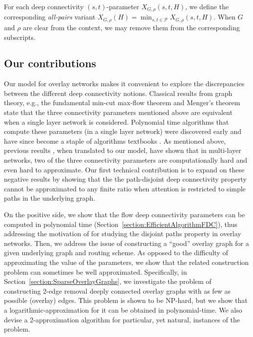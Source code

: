 \LongVersion \documentclass[11pt]{article}
\theoremstyle{definition}
\theoremstyle{plain}
\newcommand{\Peers}[0]{\mathcal{P}}
\begin{document}
For each deep connectivity $(s, t)$-parameter $X_{G,
\rho}(s,t,H)$, we define the corresponding
\emph{all-pairs} variant $X_{G, \rho}(H) = \min_{s, t \in \Peers} X_{G,
\rho}(s, t, H)$.
When $G$ and $\rho$ are clear from the context, we may remove them from the
corresponding subscripts.

\subsection{Our contributions}


Our model for overlay networks makes it convenient to explore the
discrepancies between the different deep connectivity notions.
Classical results from graph theory, e.g., the fundamental min-cut max-flow
theorem \cite{FF56,EFS56} and Menger's theorem \cite{Meng27} state that the
three connectivity parameters mentioned above are equivalent when a single
layer network is considered.
Polynomial time algorithms that compute these parameters (in a single
layer network) were discovered early \cite{FF56,Dini70,EK72} and have since
become a staple of algorithms textbooks \cite{CLRS09,KT05}.
As mentioned above, previous results \cite{prev,CDPRV07}, when translated to
our model, have shown that in multi-layer networks, two of the three
connectivity parameters are computationally hard and even hard to
approximate.
Our first technical contribution is to expand on these negative
results by showing that the the path-disjoint deep connectivity property
cannot be approximated to any finite ratio when attention is restricted to
simple paths in the underlying graph.

On the positive side, we show that the flow deep connectivity parameters can
be computed in polynomial time (Section~\ref{section:EfficientAlgorithmFDC}),
thus addressing the motivation of \cite{prev} for studying the disjoint paths
property in overlay networks.
Then, we address the issue of constructing a ``good'' overlay graph for a
given underlying graph and routing scheme.
As opposed to the difficulty of approximating the value of the parameters, we
show that the related construction problem can sometimes be well
approximated.
Specifically, in Section~\ref{section:SparseOverlayGraphs}, we investigate the
problem of constructing $2$-edge removal deeply connected overlay graphs with
as few as possible (overlay) edges.
This problem is shown to be NP-hard, but we show that a
logarithmic-approximation for it can be obtained in polynomial-time.
We also devise a 2-approximation algorithm for particular, yet natural,
instances of the problem.
\end{document}
